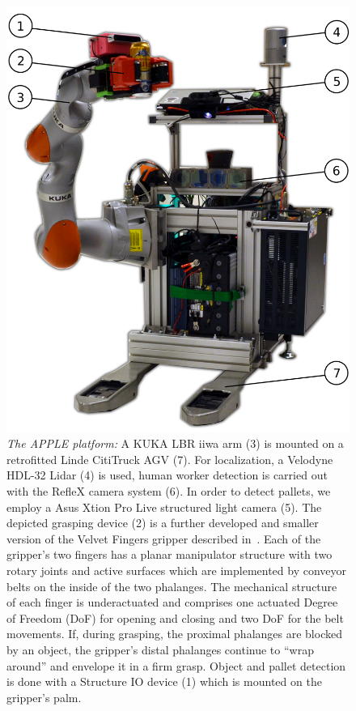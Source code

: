 \begin{figure}[t!]
\begin{center}
\includegraphics[width =0.85\linewidth]{figs/apple_demonstrator}
\caption{\textit{The APPLE platform:} A KUKA LBR iiwa arm (3) is mounted on a retrofitted Linde
  CitiTruck AGV (7). For localization, a Velodyne HDL-32 Lidar (4) is used, human worker detection
  is carried out with the RefleX camera system (6). In order to detect pallets, we employ a Asus
  Xtion Pro Live structured light camera (5). The depicted grasping device (2) is a further
  developed and smaller version of the Velvet Fingers gripper described in~\cite{Tinc12}. Each of
  the gripper’s two fingers has a planar manipulator structure with two rotary joints and active
  surfaces which are implemented by conveyor belts on the inside of the two phalanges. The
  mechanical structure of each finger is underactuated and comprises one actuated Degree of Freedom
  (DoF) for opening and closing and two DoF for the belt movements. If, during grasping, the
  proximal phalanges are blocked by an object, the gripper’s distal phalanges continue to ``wrap
  around'' and envelope it in a firm grasp. Object and pallet detection is done with a Structure IO
  device (1) which is mounted on the gripper's palm.}
\label{fig:robot}
\vspace{-0.65cm}
\end{center}
\end{figure}


